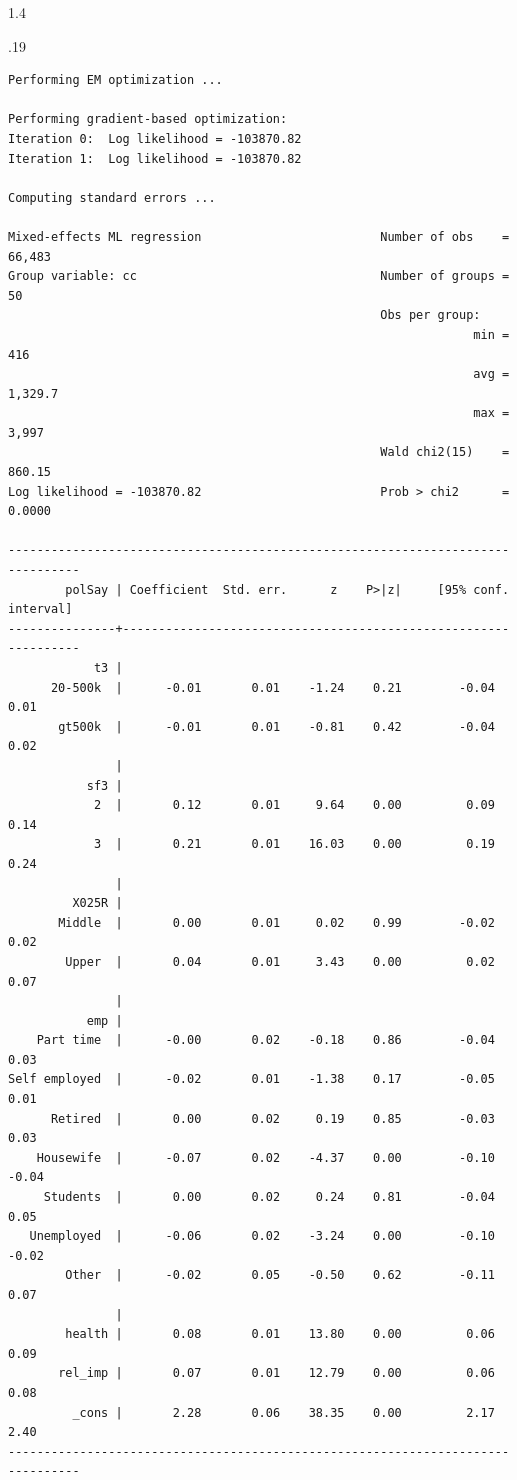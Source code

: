 \documentclass[10pt, letterpaper]{article}
\begin{document}
\begin{spacing}{1.4}
\begin{scriptsize}
\begin{spacing}{.19}
\begin{verbatim}
Performing EM optimization ...

Performing gradient-based optimization: 
Iteration 0:  Log likelihood = -103870.82  
Iteration 1:  Log likelihood = -103870.82  

Computing standard errors ...

Mixed-effects ML regression                         Number of obs    =  66,483
Group variable: cc                                  Number of groups =      50
                                                    Obs per group:
                                                                 min =     416
                                                                 avg = 1,329.7
                                                                 max =   3,997
                                                    Wald chi2(15)    =  860.15
Log likelihood = -103870.82                         Prob > chi2      =  0.0000

--------------------------------------------------------------------------------
        polSay | Coefficient  Std. err.      z    P>|z|     [95% conf. interval]
---------------+----------------------------------------------------------------
            t3 |
      20-500k  |      -0.01       0.01    -1.24    0.21        -0.04        0.01
       gt500k  |      -0.01       0.01    -0.81    0.42        -0.04        0.02
               |
           sf3 |
            2  |       0.12       0.01     9.64    0.00         0.09        0.14
            3  |       0.21       0.01    16.03    0.00         0.19        0.24
               |
         X025R |
       Middle  |       0.00       0.01     0.02    0.99        -0.02        0.02
        Upper  |       0.04       0.01     3.43    0.00         0.02        0.07
               |
           emp |
    Part time  |      -0.00       0.02    -0.18    0.86        -0.04        0.03
Self employed  |      -0.02       0.01    -1.38    0.17        -0.05        0.01
      Retired  |       0.00       0.02     0.19    0.85        -0.03        0.03
    Housewife  |      -0.07       0.02    -4.37    0.00        -0.10       -0.04
     Students  |       0.00       0.02     0.24    0.81        -0.04        0.05
   Unemployed  |      -0.06       0.02    -3.24    0.00        -0.10       -0.02
        Other  |      -0.02       0.05    -0.50    0.62        -0.11        0.07
               |
        health |       0.08       0.01    13.80    0.00         0.06        0.09
       rel_imp |       0.07       0.01    12.79    0.00         0.06        0.08
         _cons |       2.28       0.06    38.35    0.00         2.17        2.40
--------------------------------------------------------------------------------


\end{verbatim}
\end{spacing}
\end{scriptsize}
\end{spacing}
\end{document}
